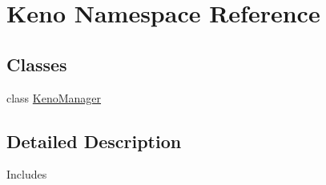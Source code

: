 \hypertarget{namespaceKeno}{}\section{Keno Namespace Reference}
\label{namespaceKeno}
\subsection*{Classes}
\begin{DoxyCompactItemize}
\item 
class \hyperlink{classKeno_1_1KenoManager}{Keno\+Manager}
\end{DoxyCompactItemize}


\subsection{Detailed Description}
Includes 